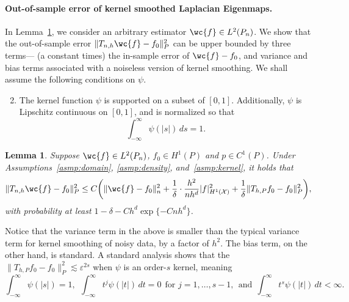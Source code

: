 \documentclass{article}
\newcommand{\1}{\mathbf{1}}
\newcommand{\mc}[1]{\mathcal{#1}}
\theoremstyle{alden}
\theoremstyle{aldenthm}
\newtheorem{lemma}{Lemma}
\theoremstyle{definition}
\theoremstyle{remark}
\begin{document}
\paragraph{Out-of-sample error of kernel smoothed Laplacian Eigenmaps.}

In Lemma~\ref{lem:kernel_smoothing_laplacian_eigenmaps}, we consider an arbitrary estimator $\wc{f} \in L^2(P_n)$. We show that the out-of-sample error $\|T_{n,h}\wc{f} - f_0\|_P^2$ can be upper bounded by three terms--- (a constant times) the in-sample error of $\wc{f} - f_0$, and variance and bias terms associated with a noiseless version of kernel smoothing. We shall assume the following conditions on $\psi$.
\begin{enumerate}[label=(K\arabic*)]
	\setcounter{enumi}{1}
	\item
	\label{asmp:kernel}
	The kernel function $\psi$ is supported on a subset of $[0,1]$. Additionally, $\psi$ is Lipschitz continuous on $[0,1]$, and is normalized so that
	\begin{equation*}
	\int_{-\infty}^{\infty} \psi(|s|) \,ds = 1.
	\end{equation*}
\end{enumerate}
\begin{lemma}
	\label{lem:kernel_smoothing_laplacian_eigenmaps}
	Suppose $\wc{f} \in L^2(P_n)$, $f_0 \in H^1(P)$ and $p \in C^1(P)$. Under Assumptions~\ref{asmp:domain}, \ref{asmp:density}, and~\ref{asmp:kernel}, it holds that
	\begin{equation}
	\label{eqn:kernel_smoothing_laplacian_eigenmaps}
	\|T_{n,h}\wc{f} - f_0\|_P^2 \leq C\biggl(\|\wc{f} - f_0\|_n^2 + \frac{1}{\delta} \cdot \frac{h^2}{nh^d} |f|_{H^1(\mc{X})}^2 + \frac{1}{\delta}\|T_{h,P}f_0 - f_0\|_P^2\biggr),
	\end{equation}
	with probability at least $1 - \delta - Ch^d\exp\{-Cnh^d\}$. 
\end{lemma}
Notice that the variance term in the above is smaller than the typical variance term for kernel smoothing of noisy data, by a factor of $h^2$. The bias term, on the other hand, is standard. A standard analysis shows that the $\|T_{h,P}f_0 - f_0\|_P^2 \lesssim \varepsilon^{2s}$ when $\psi$ is an order-$s$ kernel, meaning
\begin{equation*}
\int_{-\infty}^{\infty} \psi(|s|) = 1,~~\int_{-\infty}^{\infty} t^j \psi(|t|) \,dt = 0~~\textrm{for $j = 1,\ldots,s - 1$},~~\textrm{and}~~\int_{-\infty}^{\infty} t^s \psi(|t|) \,dt < \infty.
\end{equation*}
\end{document}
